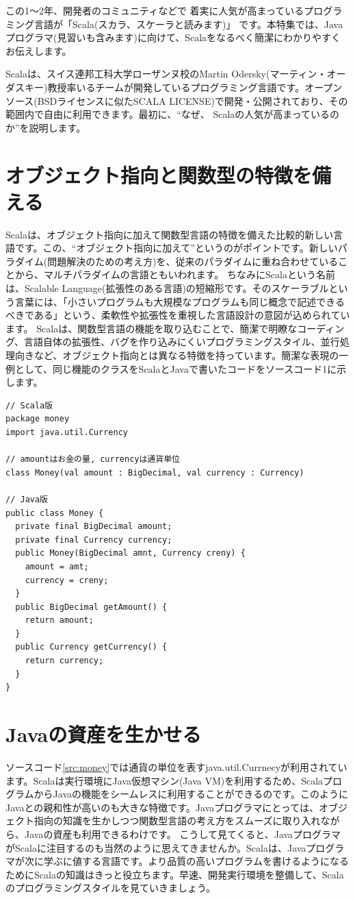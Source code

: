 \documentclass[10pt]{jarticle}
\begin{document}
\begin{screen}
この1〜2年、開発者のコミュニティなどで 着実に人気が高まっているプログラミング言語が「Scala(スカラ、スケーラと読みます)」 です。本特集では、Javaプログラマ(見習いも含みます)に向けて、Scalaをなるべく簡潔にわかりやすくお伝えします。  
\end{screen}

Scalaは、スイス連邦工科大学ローザンヌ校のMartin Odersky(マーティン・オーダスキー)教授率いるチームが開発しているプログラミング言語です。オープンソース(BSDライセンスに似たSCALA LICENSE)で開発・公開されており、その範囲内で自由に利用できます。最初に、“なぜ、 Scalaの人気が高まっているのか”を説明します。


\section*{オブジェクト指向と関数型の特徴を備える} 
Scalaは、オブジェクト指向に加えて関数型言語の特徴を備えた比較的新しい言語です。この、“オブジェクト指向に加えて”というのがポイントです。新しいパラダイム(問題解決のための考え方)を、従来のパラダイムに重ね合わせていることから、マルチパラダイムの言語ともいわれます。 ちなみにScalaという名前は、Scalable Language(拡張性のある言語)の短縮形です。そのスケーラブルという言葉には、「小さいプログラムも大規模なプログラムも同じ概念で記述できるべきである」という、柔軟性や拡張性を重視した言語設計の意図が込められています。 Scalaは、関数型言語の機能を取り込むことで、簡潔で明瞭なコーディング、言語自体の拡張性、バグを作り込みにくいプログラミングスタイル、並行処理向きなど、オブジェクト指向とは異なる特徴を持っています。簡潔な表現の一例として、同じ機能のクラスをScalaとJavaで書いたコードをソースコード1に示します。 

\begin{lstlisting}[label=src:money, caption=お金を表すクラスのScala版とJava版]
// Scala版
package money
import java.util.Currency

// amountはお金の量, currencyは通貨単位    
class Money(val amount : BigDecimal, val currency : Currency)    
 
// Java版
public class Money {
  private final BigDecimal amount;
  private final Currency currency;
  public Money(BigDecimal amnt, Currency creny) {
    amount = amt;
    currency = creny;
  }
  public BigDecimal getAmount() {
    return amount;
  }
  public Currency getCurrency() {
    return currency;
  }
}
\end{lstlisting}
\section*{Javaの資産を生かせる}
ソースコード\ref{src:money}では通貨の単位を表すjava.util.Currnecyが利用されています。Scalaは実行環境にJava仮想マシン(Java VM)を利用するため、ScalaプログラムからJavaの機能をシームレスに利用することができるのです。このようにJavaとの親和性が高いのも大きな特徴です。Javaプログラマにとっては、オブジェクト指向の知識を生かしつつ関数型言語の考え方をスムーズに取り入れながら、Javaの資産も利用できるわけです。 こうして見てくると、JavaプログラマがScalaに注目するのも当然のように思えてきませんか。Scalaは、Javaプログラマが次に学ぶに値する言語です。より品質の高いプログラムを書けるようになるためにScalaの知識はきっと役立ちます。早速、開発実行環境を整備して、Scalaのプログラミングスタイルを見ていきましょう。
\end{document}
